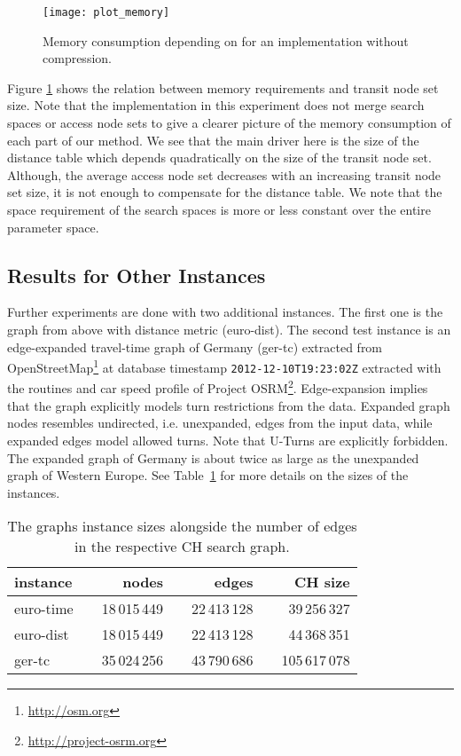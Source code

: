 \documentclass{llncs}
\begin{document}
\begin{figure}[hbt]
    \centering
    \texttt{[image: plot\_memory]}
    \caption{Memory consumption depending on  for an implementation without compression.}
    \label{fig:tnr-plotMemoryUncompressed}
\end{figure}

Figure \ref{fig:tnr-plotMemoryUncompressed} shows the relation between memory requirements and transit node set size.
Note that the implementation in this experiment does not merge search spaces or access node sets to give a clearer picture of the memory consumption of each part of our method.
We see that the main driver here is the size of the distance table which depends quadratically on the size of the transit node set.
Although, the average access node set decreases with an increasing transit node set size, it is not enough to compensate for the distance table.
We note that the space requirement of the search spaces is more or less constant over the entire parameter space.


\subsection{Results for Other Instances}\label{sec:tnr-otherInstances}

Further experiments are done with two additional instances.
The first one is the graph from above with distance metric (euro-dist).
The second test instance is an edge-expanded travel-time graph of Germany (ger-tc) extracted from OpenStreetMap\footnote{\url{http://osm.org}} at database timestamp \texttt{2012-12-10T19:23:02Z} extracted with the routines and car speed profile of Project OSRM\footnote{\url{http://project-osrm.org}}.
Edge-expansion implies that the graph explicitly models turn restrictions from the data.
Expanded graph nodes resembles undirected, i.e. unexpanded, edges from the input data, while expanded edges model allowed turns.
Note that U-Turns are explicitly forbidden.
The expanded graph of Germany is about twice as large as the unexpanded graph of Western Europe.
See Table~\ref{tab:tnr-graphs} for more details on the sizes of the instances.

\begin{table}[bth]
\caption{The graphs instance sizes alongside the number of edges in the respective CH search graph.}
\label{tab:tnr-graphs}
\centering
\begin{tabular}{lcrcrcr}
\toprule 
 instance & & nodes & & edges & & CH size \\
\midrule
 euro-time 	&  & 18\,015\,449 & & 22\,413\,128 & & 39\,256\,327 \\
 euro-dist 	&  & 18\,015\,449 & & 22\,413\,128 & & 44\,368\,351 \\
 ger-tc 		&  & 35\,024\,256 & & 43\,790\,686 & & 105\,617\,078  \\
\bottomrule 
\end{tabular}
\end{table}
\end{document}
